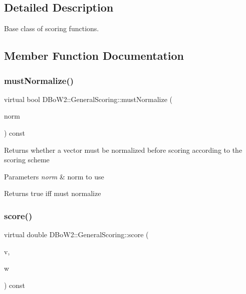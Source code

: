 \subsection{Detailed Description}
Base class of scoring functions. 

\subsection{Member Function Documentation}
\mbox{\label{classDBoW2_1_1GeneralScoring_ab0cadafd50b0f2f559f6325a6944f72f}} 
\subsubsection{\texorpdfstring{must\+Normalize()}{mustNormalize()}}
{\footnotesize\ttfamily virtual bool D\+Bo\+W2\+::\+General\+Scoring\+::must\+Normalize (\begin{DoxyParamCaption}\item[{\hyperlink{namespaceDBoW2_a53e9e0bcfc25c861815e413a7cf3fa51}{L\+Norm} \&}]{norm }\end{DoxyParamCaption}) const\hspace{0.3cm}{\ttfamily [pure virtual]}}

Returns whether a vector must be normalized before scoring according to the scoring scheme 
\begin{DoxyParams}{Parameters}
{\em norm} & norm to use \\
\hline
\end{DoxyParams}
\begin{DoxyReturn}{Returns}
true iff must normalize 
\end{DoxyReturn}
\mbox{\label{classDBoW2_1_1GeneralScoring_a43b3f5fedb19e6a19e17b9813efd17e8}} 
\subsubsection{\texorpdfstring{score()}{score()}}
{\footnotesize\ttfamily virtual double D\+Bo\+W2\+::\+General\+Scoring\+::score (\begin{DoxyParamCaption}\item[{const \hyperlink{classDBoW2_1_1BowVector}{Bow\+Vector} \&}]{v,  }\item[{const \hyperlink{classDBoW2_1_1BowVector}{Bow\+Vector} \&}]{w }\end{DoxyParamCaption}) const\hspace{0.3cm}{\ttfamily [pure virtual]}}

